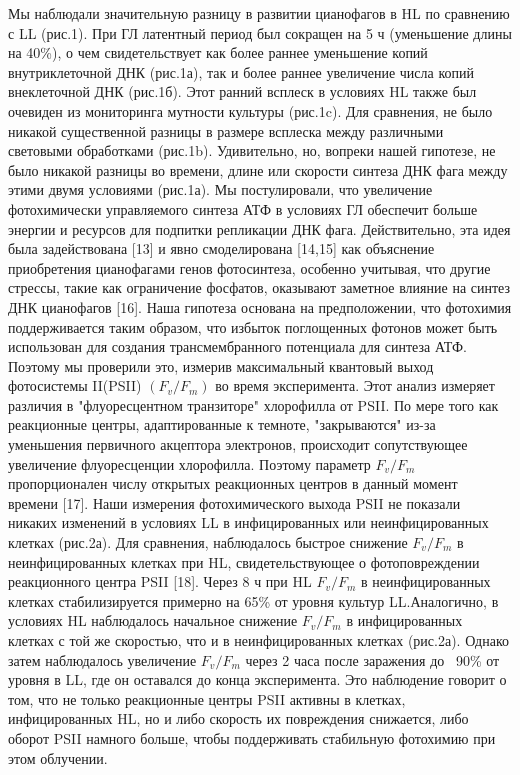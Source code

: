 \documentclass[a4paper,12pt]{article}
\begin{document}
            \par{Мы наблюдали значительную разницу в развитии цианофагов в HL по сравнению с LL (рис.1). При ГЛ
            латентный период был сокращен на 5 ч (уменьшение длины на 40\%), о чем свидетельствует как более раннее
            уменьшение копий внутриклеточной ДНК (рис.1а), так и более раннее увеличение числа копий внеклеточной ДНК
            (рис.1б). Этот ранний всплеск в условиях HL также был очевиден из мониторинга мутности культуры (рис.1c).
            Для сравнения, не было никакой существенной разницы в размере всплеска между различными световыми
            обработками (рис.1b). Удивительно, но, вопреки нашей гипотезе, не было никакой разницы во времени, длине
            или скорости синтеза ДНК фага между этими двумя условиями (рис.1а). Мы постулировали, что увеличение
            фотохимически управляемого синтеза АТФ в условиях ГЛ обеспечит больше энергии и ресурсов для подпитки
            репликации ДНК фага. Действительно, эта идея была задействована [13] и явно смоделирована [14,15] как
            объяснение приобретения цианофагами генов фотосинтеза, особенно учитывая, что другие стрессы, такие как
            ограничение фосфатов, оказывают заметное влияние на синтез ДНК цианофагов [16]. Наша гипотеза основана на
            предположении, что фотохимия поддерживается таким образом, что избыток поглощенных фотонов может быть
            использован для создания трансмембранного потенциала для синтеза АТФ. Поэтому мы проверили это, измерив
            максимальный квантовый выход фотосистемы II(PSII) $ (F_v/F_m)$ во время эксперимента. Этот анализ измеряет
            различия в "флуоресцентном транзиторе" хлорофилла от PSII. По мере того как реакционные центры,
            адаптированные к темноте, "закрываются" из-за уменьшения первичного акцептора электронов, происходит
            сопутствующее увеличение флуоресценции хлорофилла. Поэтому параметр $ F_v/F_m $ пропорционален числу
            открытых реакционных центров в данный момент времени [17]. Наши измерения фотохимического выхода PSII не
            показали никаких изменений в условиях LL в инфицированных или неинфицированных клетках (рис.2а). Для
            сравнения, наблюдалось быстрое снижение $F_v/F_m$ в неинфицированных клетках при HL, свидетельствующее о
            фотоповреждении реакционного центра PSII [18]. Через 8 ч при HL $F_v/F_m$ в неинфицированных клетках
            стабилизируется примерно на 65\% от уровня культур LL.Аналогично, в условиях HL наблюдалось начальное
            снижение $ F_v/F_m $ в инфицированных клетках с той же скоростью, что и в неинфицированных клетках
            (рис.2а). Однако затем наблюдалось увеличение $ F_v/F_m $ через 2 часа после заражения до ~90\% от уровня в
            LL, где он оставался до конца эксперимента. Это наблюдение говорит о том, что не только реакционные центры
            PSII активны в клетках, инфицированных HL, но и либо скорость их повреждения снижается, либо оборот PSII
            намного больше, чтобы поддерживать стабильную фотохимию при этом облучении.}
\end{document}
